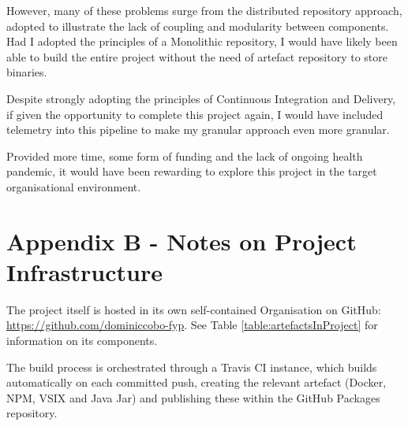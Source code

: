 However, many of these problems surge from the distributed repository approach, adopted to illustrate the lack of coupling and modularity between components. Had I adopted the principles of a Monolithic repository, I would have likely been able to build the entire project without the need of artefact repository to store binaries.

Despite strongly adopting the principles of Continuous Integration and Delivery, if given the opportunity to complete this project again, I would have included telemetry into this pipeline to make my granular approach even more granular. 

Provided more time, some form of funding and the lack of ongoing health pandemic, it would have been rewarding to explore this project in the target organisational environment.

\newpage
\section{Appendix B - Notes on Project Infrastructure}
\label{projectAssets}

The project itself is hosted in its own self-contained Organisation on GitHub: \url{https://github.com/dominiccobo-fyp}. See Table \ref{table:artefactsInProject} for information on its components.

The build process is orchestrated through a Travis CI instance, which builds automatically on each committed push, creating the relevant artefact (Docker, NPM, VSIX and Java Jar) and publishing these within the GitHub Packages repository.

